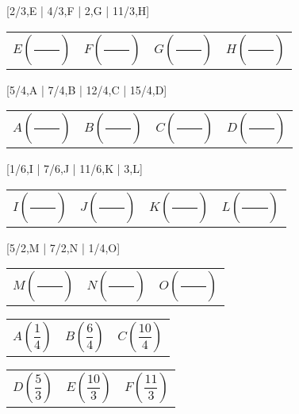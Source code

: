 
[2/3,E | 4/3,F | 2,G | 11/3,H]

\begin{tabularx}{\linewidth}{*{4}{X}}
$E\left(\dfrac{\phantom{1000}}{}\right)$&
$F\left(\dfrac{\phantom{1000}}{}\right)$&
$G\left(\dfrac{\phantom{1000}}{}\right)$&
$H\left(\dfrac{\phantom{1000}}{}\right)$\\	
\end{tabularx}

\bigskip



[5/4,A | 7/4,B | 12/4,C | 15/4,D]

\begin{tabularx}{\linewidth}{*{4}{X}}
$A\left(\dfrac{\phantom{1000}}{}\right)$&
$B\left(\dfrac{\phantom{1000}}{}\right)$&
$C\left(\dfrac{\phantom{1000}}{}\right)$&
$D\left(\dfrac{\phantom{1000}}{}\right)$\\	
\end{tabularx}


\bigskip
{}[1/6,I | 7/6,J | 11/6,K | 3,L]

\begin{tabularx}{\linewidth}{*{4}{X}}
$I\left(\dfrac{\phantom{1000}}{}\right)$&
$J\left(\dfrac{\phantom{1000}}{}\right)$&
$K\left(\dfrac{\phantom{1000}}{}\right)$&
$L\left(\dfrac{\phantom{1000}}{}\right)$\\	
\end{tabularx}

\bigskip
{}[5/2,M | 7/2,N | 1/4,O]

\begin{tabularx}{\linewidth}{*{3}{X}}
$M\left(\dfrac{\phantom{1000}}{}\right)$&
$N\left(\dfrac{\phantom{1000}}{}\right)$&
$O\left(\dfrac{\phantom{1000}}{}\right)$\\	
\end{tabularx}



\medskip
\begin{tabularx}{\linewidth}{*{3}{X}}
$A\left(\dfrac{1}{4}\right)$&
$B\left(\dfrac{6}{4}\right)$&
$C\left(\dfrac{10}{4}\right)$\\	
\end{tabularx}

\bigskip
{}

\begin{tabularx}{\linewidth}{*{3}{X}}
$D\left(\dfrac{5}{3}\right)$&
$E\left(\dfrac{10}{3}\right)$&
$F\left(\dfrac{11}{3}\right)$\\	
\end{tabularx}

